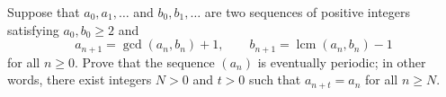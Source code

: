 Suppose that $a_0, a_1, \ldots$ and $b_0, b_1, \ldots$ are two sequences of positive integers satisfying $a_0, b_0 \geq 2$ and
\[
a_{n+1} = \gcd(a_n, b_n) + 1, \qquad b_{n+1} = \operatorname{lcm}(a_n, b_n) - 1
\]
for all $n \geq 0$. Prove that the sequence $(a_n)$ is eventually periodic; in other words, there exist integers $N > 0$ and $t > 0$ such that $a_{n+t} = a_n$ for all $n \geq N$.
